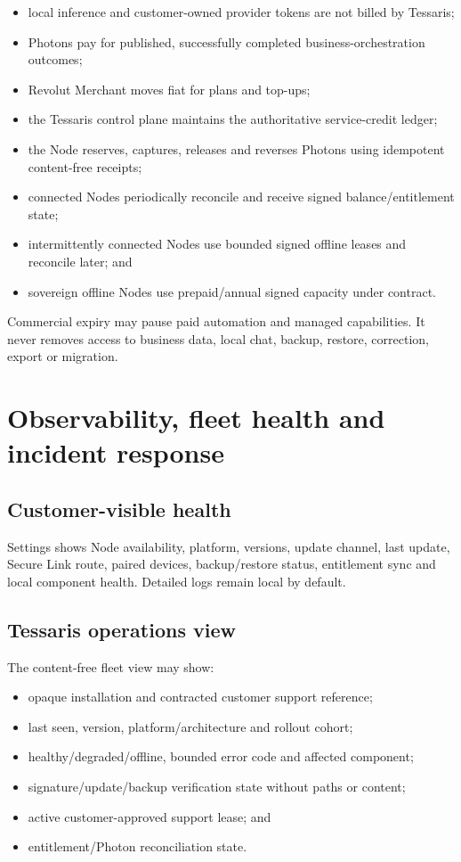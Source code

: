 \documentclass[11pt]{article}
\begin{document}
\begin{itemize}
  \item local inference and customer-owned provider tokens are not billed by Tessaris;
  \item Photons pay for published, successfully completed business-orchestration outcomes;
  \item Revolut Merchant moves fiat for plans and top-ups;
  \item the Tessaris control plane maintains the authoritative service-credit ledger;
  \item the Node reserves, captures, releases and reverses Photons using idempotent content-free receipts;
  \item connected Nodes periodically reconcile and receive signed balance/entitlement state;
  \item intermittently connected Nodes use bounded signed offline leases and reconcile later; and
  \item sovereign offline Nodes use prepaid/annual signed capacity under contract.
\end{itemize}

Commercial expiry may pause paid automation and managed capabilities. It never removes access to business data, local chat, backup, restore, correction, export or migration.

\section{Observability, fleet health and incident response}

\subsection{Customer-visible health}

Settings shows Node availability, platform, versions, update channel, last update, Secure Link route, paired devices, backup/restore status, entitlement sync and local component health. Detailed logs remain local by default.

\subsection{Tessaris operations view}

The content-free fleet view may show:

\begin{itemize}
  \item opaque installation and contracted customer support reference;
  \item last seen, version, platform/architecture and rollout cohort;
  \item healthy/degraded/offline, bounded error code and affected component;
  \item signature/update/backup verification state without paths or content;
  \item active customer-approved support lease; and
  \item entitlement/Photon reconciliation state.
\end{itemize}
\end{document}
